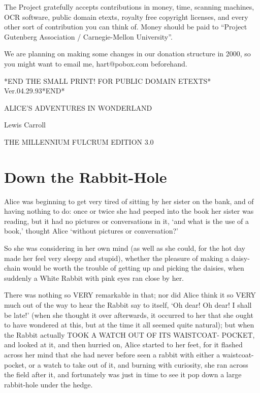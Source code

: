 \documentclass[12pt]{book}
\begin{document}
The Project gratefully accepts contributions in money, time,
scanning machines, OCR software, public domain etexts, royalty
free copyright licenses, and every other sort of contribution
you can think of.  Money should be paid to ``Project Gutenberg
Association / Carnegie-Mellon University''.

We are planning on making some changes in our donation structure
in 2000, so you might want to email me, hart@pobox.com beforehand.

*END THE SMALL PRINT! FOR PUBLIC DOMAIN ETEXTS* \newline Ver.04.29.93*END*

\newpage

\vspace*{6cm}

\begin{center}
{\Huge ALICE'S ADVENTURES IN WONDERLAND}

\vspace*{3cm}

{\Large Lewis Carroll}

\vspace{1cm}

THE MILLENNIUM FULCRUM EDITION 3.0

\end{center}

\setcounter{tocdepth}{5}
\tableofcontents       

\chapter{Down the Rabbit-Hole}

  Alice was beginning to get very tired of sitting by her sister
on the bank, and of having nothing to do:  once or twice she had
peeped into the book her sister was reading, but it had no
pictures or conversations in it, `and what is the use of a book,'
thought Alice `without pictures or conversation?'

  So she was considering in her own mind (as well as she could,
for the hot day made her feel very sleepy and stupid), whether
the pleasure of making a daisy-chain would be worth the trouble
of getting up and picking the daisies, when suddenly a White
Rabbit with pink eyes ran close by her.

  There was nothing so VERY remarkable in that; nor did Alice
think it so VERY much out of the way to hear the Rabbit say to
itself, `Oh dear!  Oh dear!  I shall be late!'  (when she thought
it over afterwards, it occurred to her that she ought to have
wondered at this, but at the time it all seemed quite natural);
but when the Rabbit actually TOOK A WATCH OUT OF ITS WAISTCOAT-
POCKET, and looked at it, and then hurried on, Alice started to
her feet, for it flashed across her mind that she had never
before seen a rabbit with either a waistcoat-pocket, or a watch to
take out of it, and burning with curiosity, she ran across the
field after it, and fortunately was just in time to see it pop
down a large rabbit-hole under the hedge.
\end{document}
